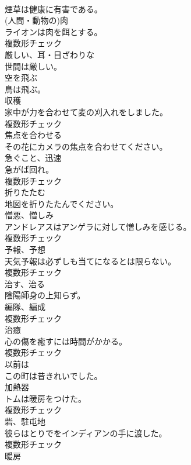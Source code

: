 \documentclass[8pt]{extreport}
\begin{document}
\begin{CJK}{UTF8}{min}
\\	煙草は健康に有害である。	
\\	[名詞]	(人間・動物の)肉	
\\	ライオンは肉を餌とする。	
\\	複数形チェック
\\	[形容詞]	厳しい、耳・目ざわりな	
\\	世間は厳しい。	
\\	[形容詞]	空を飛ぶ	
\\	鳥は飛ぶ。	
\\	[名詞]	収穫	
\\	家中が力を合わせて麦の刈入れをしました。	
\\	複数形チェック
\\	[動詞]	焦点を合わせる	
\\	その花にカメラの焦点を合わせてください。	
\\	[名詞]	急ぐこと、迅速	
\\	急がば回れ。	
\\	複数形チェック
\\	[動詞]	折りたたむ	
\\	地図を折りたたんでください。	
\\	[名詞]	憎悪、憎しみ	
\\	アンドレアスはアンゲラに対して憎しみを感じる。	
\\	複数形チェック
\\	[名詞]	予報、予想	
\\	天気予報は必ずしも当てになるとは限らない。	
\\	複数形チェック
\\	[動詞]	治す、治る	
\\	陰陽師身の上知らず。	
\\	[名詞]	編隊、編成	
\\	複数形チェック
\\	[名詞]	治癒	
\\	心の傷を癒すには時間がかかる。	
\\	複数形チェック
\\	[副詞]	以前は	
\\	この町は昔きれいでした。	
\\	[名詞]	加熱器	
\\	トムは暖房をつけた。	
\\	複数形チェック
\\	[名詞]	砦、駐屯地	
\\	彼らはとりでをインディアンの手に渡した。	
\\	複数形チェック
\\	[名詞]	暖房	

\end{CJK}
\end{document}
